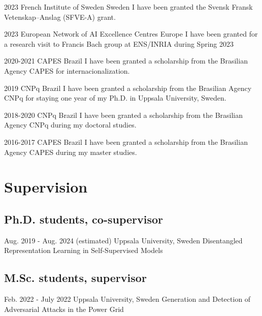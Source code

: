 \documentclass[10pt,letterpaper]{article} %
\begin{document}
    { 2023 }
    { French Institute of Sweden }
    { Sweden }
    { I have been granted the Svensk Fransk Vetenskap–Anslag (SFVE-A) grant. }

    { 2023 }
    { European Network of AI Excellence Centres }
    { Europe }
    { I have been granted for a research visit to Francis Bach group at ENS/INRIA during Spring 2023 }

    { 2020-2021 }
    { CAPES }
    { Brazil }
    { I have been granted a scholarship from the Brasilian Agency CAPES for internacionalization. }

    { 2019 }
    { CNPq }
    { Brazil }
    { I have been granted a scholarship from the Brasilian Agency CNPq for staying one year of my Ph.D. in Uppsala University, Sweden. }

    { 2018-2020 }
    { CNPq }
    { Brazil }
    { I have been granted a scholarship from the Brasilian Agency CNPq during my doctoral studies. }

    { 2016-2017 }
    { CAPES }
    { Brazil }
    { I have been granted a scholarship from the Brasilian Agency CAPES during my master studies. }


\section*{Supervision}


\subsection*{\noindent Ph.D. students, co-supervisor  }
    
        { Aug. 2019 - Aug. 2024 (estimated) }
        {  }
        { Uppsala University, Sweden }
        { { Disentangled Representation Learning in Self-Supervised Models } }
        

\subsection*{\noindent M.Sc. students, supervisor  }
    
        { Feb. 2022 - July 2022 }
        {  }
        { Uppsala University, Sweden }
        { { Generation and Detection of Adversarial Attacks in the Power Grid } }
        
\end{document}
